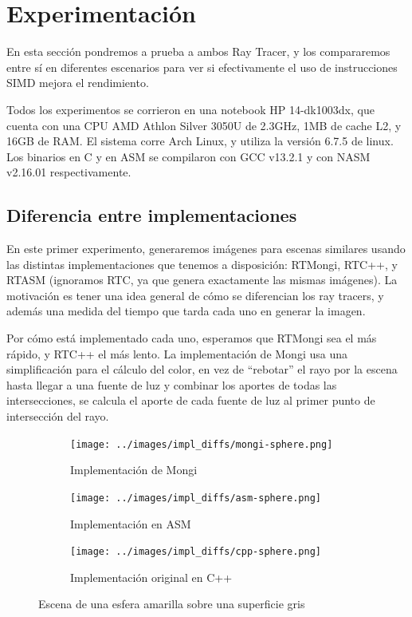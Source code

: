 \section{Experimentación} \label{sec:experimentacion}

En esta sección pondremos a prueba a ambos Ray Tracer, y los compararemos entre
sí en diferentes escenarios para ver si efectivamente el uso de instrucciones
SIMD mejora el rendimiento.

Todos los experimentos se corrieron en una notebook HP 14-dk1003dx, que cuenta
con una CPU AMD Athlon Silver 3050U de 2.3GHz, 1MB de cache L2, y 16GB de RAM.
El sistema corre Arch Linux, y utiliza la versión 6.7.5 de linux. Los binarios
en C y en ASM se compilaron con GCC v13.2.1 y con NASM v2.16.01 respectivamente.

\subsection{Diferencia entre implementaciones}

En este primer experimento, generaremos imágenes para escenas similares usando
las distintas implementaciones que tenemos a disposición: RTMongi, RTC++, y
RTASM (ignoramos RTC, ya que genera exactamente las mismas imágenes). La
motivación es tener una idea general de cómo se diferencian los ray tracers, y
además una medida del tiempo que tarda cada uno en generar la imagen.

Por cómo está implementado cada uno, esperamos que RTMongi sea el más rápido, y
RTC++ el más lento. La implementación de Mongi usa una simplificación para el
cálculo del color, en vez de ``rebotar'' el rayo por la escena hasta llegar a
una fuente de luz y combinar los aportes de todas las intersecciones, se calcula
el aporte de cada fuente de luz al primer punto de intersección del rayo.

\begin{figure}[H]
  \centering
  \begin{subfigure}[b]{0.45\textwidth}
    \centering
    \texttt{[image: ../images/impl\_diffs/mongi-sphere.png]}
    \caption{Implementación de Mongi}
    \label{fig:yellow-sphere-mongi}
  \end{subfigure}
  \hfill
  \begin{subfigure}[b]{0.45\textwidth}
    \centering
    \texttt{[image: ../images/impl\_diffs/asm-sphere.png]}
    \caption{Implementación en ASM}
    \label{fig:yellow-sphere-asm}
  \end{subfigure}
  \hfill
  \begin{subfigure}[b]{0.45\textwidth}
    \centering
    \texttt{[image: ../images/impl\_diffs/cpp-sphere.png]}
    \caption{Implementación original en C++}
    \label{fig:yellow-sphere-cpp}
  \end{subfigure}

  \caption{Escena de una esfera amarilla sobre una superficie gris}
  \label{fig:yellow-sphere}
\end{figure}

